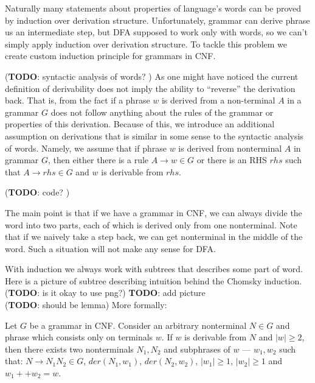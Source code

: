 Naturally many statements about properties of language's words can be proved by induction over derivation structure. Unfortunately, grammar can derive phrase us an intermediate step, but DFA supposed to work only with words, so we can’t simply apply induction over derivation structure. To tackle this problem we create custom induction principle for grammars in CNF.

(\textbf{TODO}: syntactic analysis of words? )
As one might have noticed the current definition of derivability does not imply the ability to “reverse” the derivation back. That is, from the fact if a phrase $w$ is derived from a non-terminal $A$ in a grammar $G$ does not follow anything about the rules of the grammar or properties of this derivation. Because of this, we introduce an additional assumption on derivations that is similar in some sense to the syntactic analysis of words.
Namely, we assume that if phrase $w$ is derived from nonterminal $A$ in grammar $G$, then either there is a rule $A \to w \in G$ or there is an RHS $rhs$ such that $A \to rhs \in G$ and $w$ is derivable from $rhs$.

(\textbf{TODO}: code? )


The main point is that if we have a grammar in CNF, we can always divide the word into two parts, each of which is derived only from one nonterminal. Note that if we naively take a step back, we can get nonterminal in the middle of the word. Such a situation will not make any sense for DFA.

With induction we always work with subtrees that describes some part of word. Here is a picture of subtree describing intuition behind the Chomsky induction. \\
(\textbf{TODO}: is it okay to use png?)
\textbf{TODO}: add picture\\ 

(\textbf{TODO}: should be lemma) More formally: 
\begin{theorem}
Let $G$ be a grammar in CNF. Consider an arbitrary nonterminal $N \in G$ and phrase which consists only on terminals $w$. 
If $w$ is derivable from $N$ and $|w| \ge 2$, then there exists two nonterminals $N_1, N_2$ and subphrases of $w$ --- $w_1, w_2$ such that: $N \to N_1 N_2 \in G$, $der(N_1, w_1)$, $der(N_2, w_2)$, $|w_1| \ge 1$, $|w_2| \ge 1$ and $w_1 ++ w_2 = w$.
\end{theorem}

